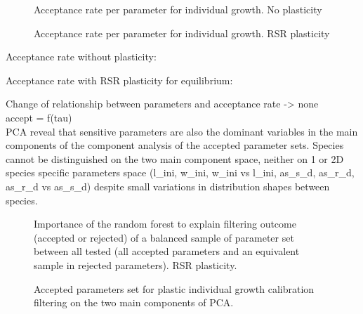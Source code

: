 \begin{figure}
\caption{Acceptance rate per parameter for individual growth. No plasticity}
\end{figure}

\begin{figure}
\caption{Acceptance rate per parameter for individual growth. RSR plasticity}
\end{figure}

Acceptance rate without plasticity:

Acceptance rate with RSR plasticity for equilibrium:


Change of relationship between parameters and acceptance rate -> none\\
accept = f(tau)\\

PCA reveal that sensitive parameters are also the dominant variables in the main components of the component analysis of the accepted parameter sets. Species cannot be distinguished on the two main component space, neither on 1 or 2D species specific parameters space (l\_ini, w\_ini, w\_ini vs l\_ini, as\_s\_d, as\_r\_d, as\_r\_d vs as\_s\_d) despite small variations in distribution shapes between species.\\



\begin{figure}
\caption{Importance of the random forest to explain filtering outcome (accepted or rejected) of a balanced sample of parameter set between all tested (all accepted parameters and an equivalent sample in rejected parameters).  RSR plasticity.}
\end{figure}

\begin{figure}
\caption{Accepted parameters set for plastic individual growth calibration filtering  on the two main components of PCA.}
\end{figure}

